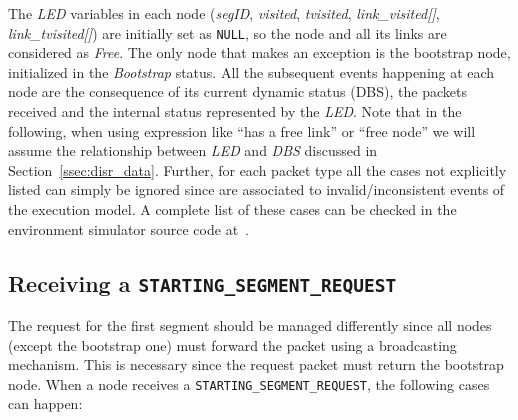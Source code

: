 The \emph{LED} variables in each node
(\emph{segID}, \emph{visited}, \emph{tvisited}, \emph{link\_visited[]}, \emph{link\_tvisited[]})
are initially set as \texttt{NULL}, so the node and all its links
are considered as \emph{Free}.
The only node that makes an exception is the bootstrap node, initialized
in the \emph{Bootstrap} status. All the subsequent events happening at
each node are the consequence of its current dynamic status (DBS), the
packets received and the internal status represented by the
\emph{LED}. Note that in the following, when using expression like
``has a free link'' or ``free node'' we will assume the relationship between 
\emph{LED} and \emph{DBS} discussed in Section~\ref{ssec:disr_data}. Further, for
each packet type all the cases not explicitly listed can simply be
ignored since are associated to invalid/inconsistent events of the
\disr{} execution model. A complete list of these cases can be checked
in the environment simulator source code at~\cite{nanoxim}.

\subsection{Receiving a \texttt{STARTING\_SEGMENT\_REQUEST}}
The request for the first segment should be managed differently since
all nodes (except the bootstrap one) must forward the packet using a
broadcasting mechanism. This is necessary since the request packet must
return the bootstrap node.
When a node receives a \texttt{STARTING\_SEGMENT\_REQUEST}, the
following cases can happen:

